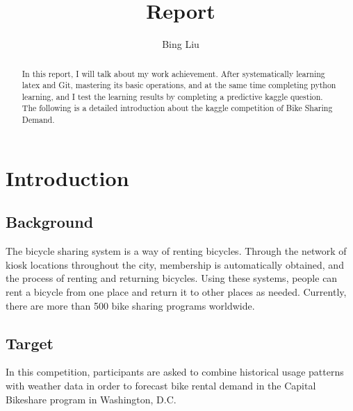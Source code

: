 \documentclass{amsart}
\begin{document}
%
%
\title[Report]{Report}%

\author{Bing Liu}
\address[A.~1]{School of Computer Science,\\ 
Jilin University, ChangChun 130012, China}%


%
\date{\gitAuthorDate}%

%

\begin{abstract}
	In this report, I will talk about my work achievement. After systematically learning latex and Git, mastering its basic operations, and at the same time completing python learning, and I test the learning results by completing a predictive kaggle question. The following is a detailed introduction about the kaggle competition of Bike Sharing Demand.
\end{abstract}

%


\maketitle
\tableofcontents

\newpage

%
\section{Introduction}\label{sec-intro}

\subsection{Background}
The bicycle sharing system is a way of renting bicycles. Through the network of kiosk locations throughout the city, membership is automatically obtained, and the process of renting and returning bicycles. Using these systems, people can rent a bicycle from one place and return it to other places as needed. Currently, there are more than 500 bike sharing programs worldwide.\\

\subsection{Target}
In this competition, participants are asked to combine historical usage patterns with weather data in order to forecast bike rental demand in the Capital Bikeshare program in Washington, D.C.
\end{document}
